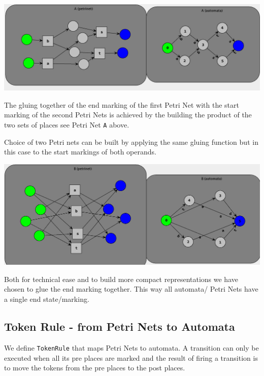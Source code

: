 \documentclass[]{article}
\begin{document}
\begin{center}\begin{minipage}{0.9\textwidth}
\includegraphics[scale=0.4]{SeqNets.png}
\end{minipage}\end{center}


The gluing together of the end marking  of the first Petri Net with the start marking of the second Petri Nets is achieved by the building the {\sf product of the two sets of places} see Petri Net \verb|A| above. 

Choice of two Petri nets can be built by applying the same gluing function but in this case to the start markings of both operands. 
\begin{center}\begin{minipage}{0.9\textwidth}
\includegraphics[scale=0.4]{ChoiceNets.png}
\end{minipage}\end{center}

Both for technical ease and to build more compact representations we have chosen to glue the end marking together. This way all automata/ Petri Nets have a single end state/marking.

\subsection{Token Rule - from Petri Nets to Automata}


 We define \verb|TokenRule| that maps Petri Nets to automata.  A transition can only be executed when all its pre places are marked and the result of firing a transition is to move the tokens from the pre places to the post places.
 
\end{document}
